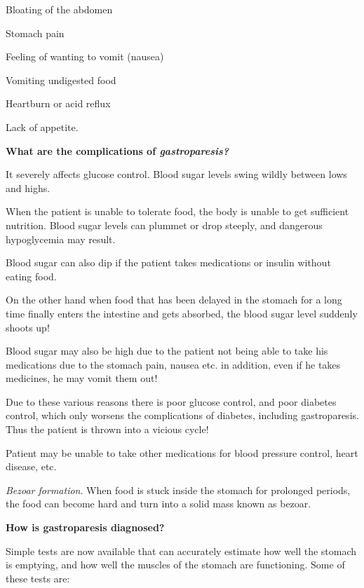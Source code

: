  \item Bloating of the abdomen

 \item Stomach pain

 \item Feeling of wanting to vomit (nausea)

 \item Vomiting undigested food

 \item Heartburn or acid reflux

 \item Lack of appetite.

\textbf{What are the complications of \textit{gastroparesis?}}

\item 
 It severely affects glucose control. Blood sugar levels swing wildly between lows and highs.

 When the patient is unable to tolerate food, the body is unable to get sufficient nutrition. Blood sugar levels can plummet or drop steeply, and dangerous hypoglycemia may result.

 Blood sugar can also dip if the patient takes medications or insulin without eating food.

 On the other hand when food that has been delayed in the stomach for a long time finally enters the intestine and gets absorbed, the blood sugar level suddenly shoots up!

 Blood sugar may also be high due to the patient not being able to take his medications due to the stomach pain, nausea etc. in addition, even if he takes medicines, he may vomit them out!

 Due to these various reasons there is poor glucose control, and poor diabetes control, which only worsens the complications of diabetes, including gastroparesis. Thus the patient is thrown into a vicious cycle!

 \item Patient may be unable to take other medications for blood pressure control, heart disease, etc.

 \item \textit{Bezoar formation}. When food is stuck inside the stomach for prolonged periods, the food can become hard and turn into a solid mass known as bezoar.

\textbf{How is gastroparesis diagnosed?}

Simple tests are now available that can accurately estimate how well the stomach is emptying, and how well the muscles of the stomach are functioning. Some of these tests are:

